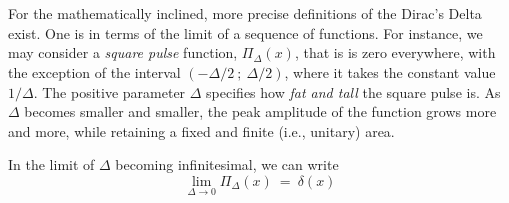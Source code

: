 \newpage
\begin{svgraybox}
	\\
	\\
	For the mathematically inclined, more precise definitions of the Dirac's Delta exist. One is in terms of the limit of a sequence of functions. For instance, we may consider a \textit{square pulse} function, \(\Pi_\Delta(x)\), that is is zero everywhere, with the exception of the interval \((-\Delta/2\ ;\ \Delta/2)\), where it takes the constant value \( 1 / \Delta \). The positive parameter \(\Delta \) specifies how \textit{fat and tall} the square pulse is. As \(\Delta \) becomes smaller and smaller, the peak amplitude of the function grows more and more, while retaining a fixed and finite (i.e., unitary) area. 

 
  In the limit of \(\Delta\) becoming infinitesimal, we can write
    \begin{equation}
		\lim_{\Delta \rightarrow 0} \Pi_\Delta(x)\ =\ \delta(x)
	\end{equation}	
	

\end{svgraybox}
